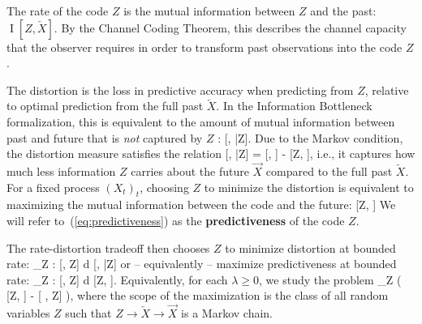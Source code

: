 \documentclass[entropy,article,submit,moreauthors,pdftex,10pt,a4paper]{Definitions/mdpi}
\newcommand{\future}{\overrightarrow{X}}
\newcommand{\past}{\overleftarrow{X}}
\newcommand{\key}{\textbf}
\let\oldequation\equation
\let\oldendequation\endequation
\renewenvironment{equation}
  {\linenomathNonumbers\oldequation}
  {\oldendequation\endlinenomath}
\begin{document}
The rate of the code $Z$ is the mutual information between $Z$ and the past: $\operatorname{I}[Z, \past]$.
By the Channel Coding Theorem, this describes the channel capacity that the observer requires in order to transform past observations into the code $Z$.

The distortion is the loss in predictive accuracy when predicting from $Z$, relative to optimal prediction from the full past $\past$.
In the Information Bottleneck formalization, this is equivalent to the amount of mutual information between past and future that is \emph{not} captured by $Z$ \citep{harremoes2007information}: 
\begin{equation}
	[\past, \future|Z].
\end{equation}
Due to the Markov condition, the distortion measure satisfies the relation
\begin{equation}
	[\past, \future|Z] = [\past, \future] - [Z, \future],
\end{equation}
i.e., it captures how much less information $Z$ carries about the future $\future$ compared to the full past $\past$.
For a fixed process $(X_t)_t$, choosing $Z$ to minimize the distortion is equivalent to maximizing the mutual information between the code and the future:
\begin{equation}\label{eq:predictiveness}
[Z, \future]
\end{equation}
We will refer to~(\ref{eq:predictiveness}) as the \key{predictiveness} of the code $Z$.

The rate-distortion tradeoff then chooses $Z$ to %
 minimize distortion at bounded rate:
\begin{equation}
\min_{Z :  [\past, Z] \leq d}  [\past, \future|Z] 
\end{equation}
or -- equivalently -- maximize predictiveness at bounded rate:
\begin{equation}
\max_{Z :  [\past, Z] \leq d}  [Z, \future].
\end{equation}
Equivalently, for each  $\lambda \geq 0$, we study the problem 
\begin{equation}\label{eq:ib}
	\max_{Z} \left( [Z, \future] - \lambda \cdot {}[ \past, Z] \right),
\end{equation}
where the scope of the maximization is the class of all random variables $Z$ such that $Z \rightarrow \past \rightarrow \future$ is a Markov chain. %
\end{document}
